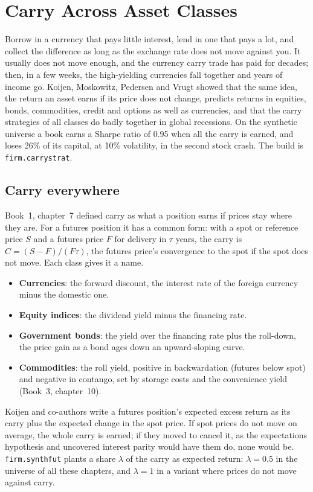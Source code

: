 \chapter{Carry Across Asset Classes}\label{ch:s1:carry-across-asset-classes}

Borrow in a currency that pays little interest, lend in one that pays a lot, and collect the difference as long as the exchange rate does not move
against you. It usually does not move enough, and the currency carry trade has paid for decades; then, in a few weeks, the high-yielding currencies fall
together and years of income go. Koijen, Moskowitz, Pedersen and Vrugt showed that the same idea, the return an asset earns if its price does not change,
predicts returns in equities, bonds, commodities, credit and options as well as currencies, and that the carry strategies of all classes do badly together
in global recessions. On the synthetic universe a  book earns a Sharpe ratio of 0.95 when all the carry is earned, and loses 26\% of its
capital, at 10\% volatility, in the second stock crash. The build is \texttt{firm.carrystrat}.

\section{Carry everywhere}

Book~1, chapter~7 defined carry as what a position earns if prices stay where they are. For a futures position it has a common form: with a spot or
reference price $S$ and a futures price $F$ for delivery in $\tau$ years, the carry is $C = (S - F)/(F\tau)$, the futures price's convergence to the spot
if the spot does not move. Each class gives it a name.
\begin{itemize}
\item \textbf{Currencies}: the forward discount, the interest rate of the foreign currency minus the domestic one.
\item \textbf{Equity indices}: the dividend yield minus the financing rate.
\item \textbf{Government bonds}: the yield over the financing rate plus the roll-down, the price gain as a bond ages down an upward-sloping curve.
\item \textbf{Commodities}: the roll yield, positive in backwardation (futures below spot) and negative in contango, set by storage costs and the
convenience yield (Book~3, chapter~10).
\end{itemize}
Koijen and co-authors write a futures position's expected excess return as its carry plus the expected change in the spot price. If spot prices do not
move on average, the whole carry is earned; if they moved to cancel it, as the expectations hypothesis and uncovered interest parity would have them do,
none would be. \texttt{firm.synthfut} plants a share $\lambda$ of the carry as expected return: $\lambda = 0.5$ in the universe of all these chapters, and
$\lambda = 1$ in a variant where prices do not move against carry.

